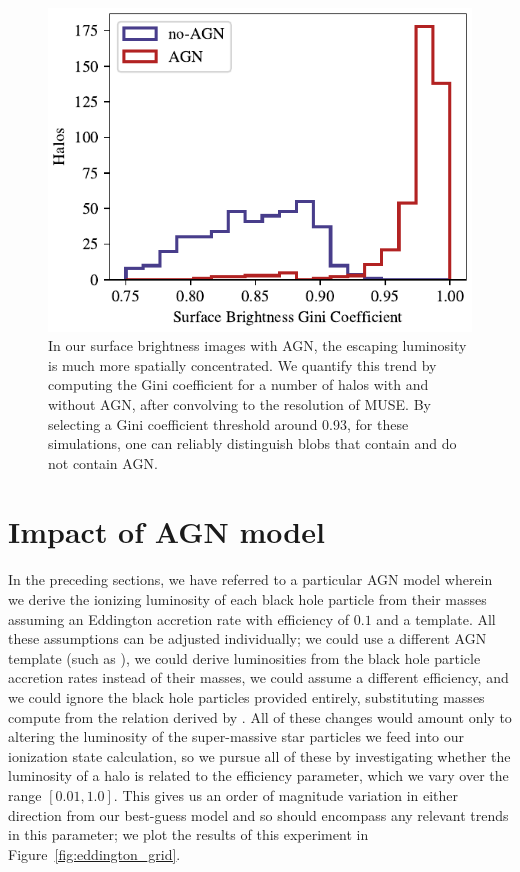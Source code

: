 \begin{figure}
    \centering
    \includegraphics[width=\textwidth,keepaspectratio]{figures/skew_distribution.pdf}
    \caption{
        In our surface brightness images with AGN, the escaping luminosity is much more spatially concentrated.
        We quantify this trend by computing the Gini coefficient for a number of halos with and without AGN, after convolving to the resolution of MUSE.
        By selecting a Gini coefficient threshold around 0.93, for these simulations, one can reliably distinguish blobs that contain and do not contain AGN.
    }
    \label{fig:skewness}
\end{figure}


\section{Impact of AGN model}

In the preceding sections, we have referred to a particular AGN model wherein we derive the ionizing luminosity of each black hole particle from their masses assuming an Eddington accretion rate with efficiency of $0.1$ and a \citet*{Hopkins2007} template.
All these assumptions can be adjusted individually; we could use a different AGN template (such as \citet{Nenkova2008}), we could derive luminosities from the black hole particle accretion rates instead of their masses, we could assume a different efficiency, and we could ignore the black hole particles provided entirely, substituting masses compute from the relation derived by \citet{Magorrian1998}.
All of these changes would amount only to altering the luminosity of the super-massive star particles we feed into our ionization state calculation, so we pursue all of these by investigating whether the luminosity of a halo is related to the efficiency parameter, which we vary over the range $[0.01, 1.0]$.
This gives us an order of magnitude variation in either direction from our best-guess model and so should encompass any relevant trends in this parameter; we plot the results of this experiment in Figure~\ref{fig:eddington_grid}.

